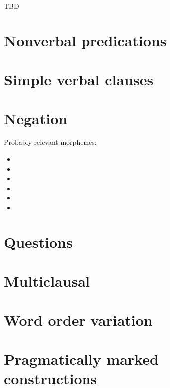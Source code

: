 \documentclass{memoir}
\begin{document}
TBD

\chapter{\texorpdfstring{Nonverbal predications
\label{nonverbal}}{Nonverbal predications }}

\chapter{\texorpdfstring{Simple verbal clauses
\label{simpleverb}}{Simple verbal clauses }}

\chapter{\texorpdfstring{Negation \label{negation}}{Negation }}

Probably relevant morphemes:

\begin{itemize}
\item
\item
\item
\item
\item
\item
\end{itemize}

\chapter{\texorpdfstring{Questions \label{questions}}{Questions }}

\chapter{\texorpdfstring{Multiclausal
\label{multiclausal}}{Multiclausal }}

\chapter{\texorpdfstring{Word order variation
\label{wordorder}}{Word order variation }}

\chapter{\texorpdfstring{Pragmatically marked constructions
\label{marked}}{Pragmatically marked constructions }}
\end{document}
